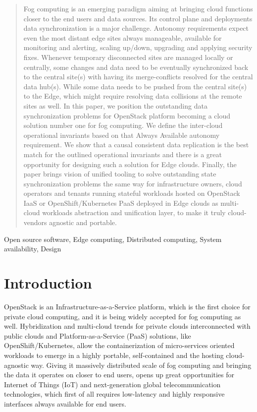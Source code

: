\documentclass[conference]{IEEEtran}
\begin{document}
\begin{abstract}
Fog computing is an emerging paradigm aiming at bringing cloud functions closer
to the end users and data sources. Its control plane and deployments data
synchronization is a major challenge. Autonomy requirements expect even the
most distant edge sites always manageable, available for monitoring and
alerting, scaling up/down, upgrading and applying security fixes. Whenever
temporary disconnected sites are managed locally or centrally, some changes
and data need to be eventually synchronized back to the central site(s) with
having its merge-conflicts resolved for the central data hub(s). While some
data needs to be pushed from the central site(s) to the Edge, which might
require resolving data collisions at the remote sites as well. In this paper,
we position the outstanding data synchronization problems for OpenStack
platform becoming a cloud solution number one for fog computing. We define
the inter-cloud operational invariants based on that Always Available
autonomy requirement.  We show that a causal consistent data replication is
the best match for the outlined operational invariants and there is a great
opportunity for designing such a solution for Edge clouds. Finally, the paper
brings vision of unified tooling to solve outstanding state synchronization
problems the same way for infrastructure owners, cloud operators and tenants
running stateful workloads hosted on OpenStack IaaS or OpenShift/Kubernetes
PaaS deployed in Edge clouds as multi-cloud workloads abstraction and
unification layer, to make it truly cloud-vendors agnostic and portable.
\end{abstract}

\begin{IEEEkeywords}
Open source software, Edge computing, Distributed computing, System
availability, Design
\end{IEEEkeywords}

\section{Introduction}

OpenStack is an Infrastructure-as-a-Service platform, which is the first choice 
for private cloud computing, and it is being widely accepted for fog computing
as well. Hybridization and multi-cloud trends for private clouds interconnected
with public clouds and Platform-as-a-Service (PaaS) solutions, like
OpenShift/Kubernetes, allow the containerization of micro-services oriented
workloads to emerge in a highly portable, self-contained and the hosting
cloud-agnostic way. Giving it massively distributed scale of fog computing and
bringing the data it operates on closer to end users, opens up great opportunities
for Internet of Things (IoT) and next-generation global telecommunication technologies,
which first of all requires low-latency and highly responsive interfaces always
available for end users.
\end{document}
